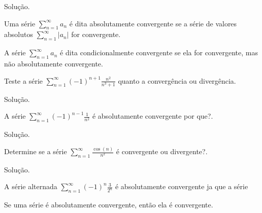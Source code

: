 \begin{ex}
\begin{ex}
	Solução.
\end{ex}
\vspace*{5cm}
\begin{df}
	Uma série $\sum_{n=1}^{\infty}a_{n}$ é dita absolutamente convergente se a série de valores absolutos $\sum_{n=1}^{\infty}|a_{n}|$ for convergente.
\end{df}
\begin{df}
	A série $\sum_{n=1}^{\infty}a_{n}$ é dita condicionalmente convergente se ela for convergente, mas não absolutamente convergente.
\end{df}
\begin{ex}
	Teste a série $\sum_{n=1}^{\infty}(-1)^{n+1}\frac{n^{2}}{n^{3}+1}$ quanto a convergência ou divergência.
	
	Solução.
\end{ex}
\vspace*{5cm}
\begin{ex}
	A série $\sum_{n=1}^{\infty}(-1)^{n-1}\frac{1}{n^{2}}$ é absolutamente convergente por que?.
	
	Solução.
\end{ex}

\vspace*{5cm}
\begin{ex}
Determine se a série $\sum_{n=1}^{\infty}\frac{\cos (n)}{n^{2}}$ é convergente ou divergente?.
	
	Solução.
\end{ex}
\vspace*{5cm}
\begin{ex}
	A série alternada $\sum_{n=1}^{\infty}(-1)^{n}\frac{3}{2^{n}}$ é absolutamente convergente ja que a série
\end{ex}
\vspace*{5cm}
\begin{teo} 
	Se uma série é absolutamente convergente, então ela é convergente.
\end{teo}

\end{ex}
